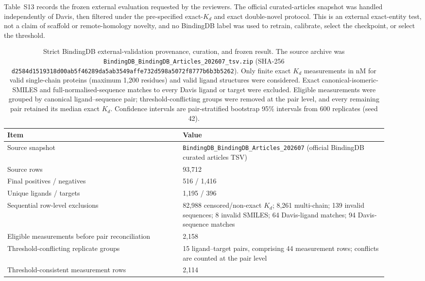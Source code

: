 \documentclass[11pt]{article}
\begin{document}
Table~S13 records the frozen external evaluation requested by the reviewers.
The official curated-articles snapshot was handled independently of Davis, then
filtered under the pre-specified exact-$K_d$ and exact double-novel protocol.
This is an external exact-entity test, not a claim of scaffold or remote-homology
novelty, and no BindingDB label was used to retrain, calibrate, select the
checkpoint, or select the threshold.

\begin{table}[H]
\centering
\small
\caption{Strict BindingDB external-validation provenance, curation, and frozen
result. The source archive was \texttt{BindingDB\_BindingDB\_Articles\_202607\_tsv.zip}
(SHA-256 \texttt{d2584d1519318d00ab5f46289da5ab3549affe732d598a5072f8777b6b3b5262}).
Only finite exact $K_d$ measurements in nM for valid single-chain proteins
(maximum 1,200 residues) and valid ligand structures were considered. Exact
canonical-isomeric-SMILES and full-normalised-sequence matches to every Davis
ligand or target were excluded. Eligible measurements were grouped by canonical
ligand--sequence pair; threshold-conflicting groups were removed at the pair
level, and every remaining pair retained its median exact $K_d$. Confidence
intervals are pair-stratified bootstrap 95\% intervals from 600 replicates
(seed 42).}
\label{tab:bindingdb_external_si}
\begin{tabular}{p{0.42\linewidth}p{0.49\linewidth}}
\toprule
Item & Value \\
\midrule
Source snapshot & {\scriptsize\texttt{BindingDB\_BindingDB\_\linebreak[0]Articles\_202607}} (official BindingDB curated articles TSV) \\
Source rows & 93,712 \\
Final positives / negatives & 516 / 1,416 \\
Unique ligands / targets & 1,195 / 396 \\
Sequential row-level exclusions & 82,988 censored/non-exact $K_d$; 8,261 multi-chain; 139 invalid sequences; 8 invalid SMILES; 64 Davis-ligand matches; 94 Davis-sequence matches \\
Eligible measurements before pair reconciliation & 2,158 \\
Threshold-conflicting replicate groups & 15 ligand--target pairs, comprising 44 measurement rows; conflicts are counted at the pair level \\
Threshold-consistent measurement rows & 2,114 \\

\end{tabular}
\end{table}
\end{document}
